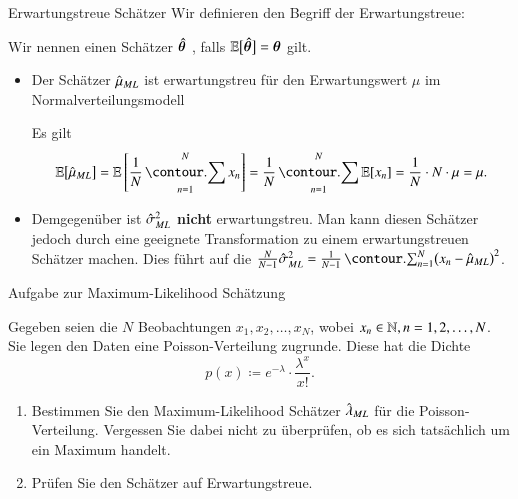 \begin{frame}{Erwartungstreue Schätzer}{}
	Wir definieren den Begriff der Erwartungstreue:
	\begin{mydef}
		Wir nennen einen Schätzer $\bm{\hat{\theta}}$ , falls $\mathbb{E}\bigl[ \bm{\hat{\theta}} \bigr] = \bm{\theta}$ gilt.
	\end{mydef}
	
	\begin{itemize}
		\item Der Schätzer $\hat{\mu}_{ML}$ ist erwartungstreu für den Erwartungswert $\mu$
		im Normalverteilungsmodell \\ \vspace*{2mm}
		\begin{myproof}
			Es gilt
			\begin{equation*}
				\E\bigl[ \muML \bigr]
					= \E\left[ \frac{1}{N} \sum_{n=1}^N x_n \right]
					= \frac{1}{N} \sum_{n=1}^N \E[x_n]
					= \frac{1}{N} \cdot N \cdot \mu
					= \mu.
			\end{equation*}
		\end{myproof}
		\item Demgegenüber ist $\hat{\sigma}^2_{ML}$ \textbf{nicht} erwartungstreu.
			Man kann diesen Schätzer jedoch durch eine geeignete Transformation
			zu einem erwartungstreuen Schätzer machen. Dies führt auf die 
			$\frac{N}{N - 1} \sigmasquML = \frac{1}{N - 1} \sum_{n=1}^N \bigl( x_n - \muML \bigr)^2$.
	\end{itemize}
\end{frame}


\begin{frame}{Aufgabe zur Maximum-Likelihood Schätzung}{}
	\begin{mytask}
		Gegeben seien die $N$ Beobachtungen $x_1, x_2, \ldots, x_N$, wobei $x_n \in \mathbb{N}, n = 1, 2, \ldots, N$.
		Sie legen den Daten eine Poisson-Verteilung zugrunde. Diese hat die Dichte
		\begin{equation*}
			p(x) \coloneqq e^{-\lambda} \cdot \frac{\lambda^x}{x!}.
		\end{equation*}
		
		\begin{enumerate}
			\item Bestimmen Sie den Maximum-Likelihood Schätzer $\hat{\lambda}_{ML}$ für die Poisson-Verteilung.
				Vergessen Sie dabei nicht zu überprüfen, ob es sich tatsächlich um ein Maximum handelt.
			\item Prüfen Sie den Schätzer auf Erwartungstreue.
		\end{enumerate}
	\end{mytask}
\end{frame}


